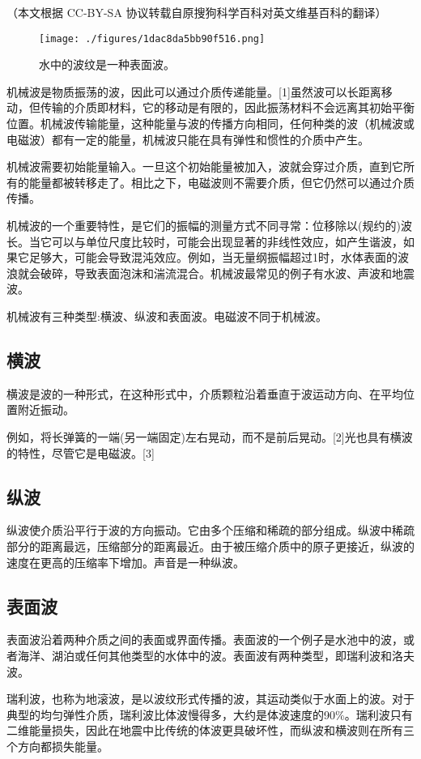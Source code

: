 
（本文根据 CC-BY-SA 协议转载自原搜狗科学百科对英文维基百科的翻译）

\begin{figure}[ht]
\centering
\texttt{[image: ./figures/1dac8da5bb90f516.png]}
\caption{水中的波纹是一种表面波。} \label{fig_JXB_1}
\end{figure}

机械波是物质振荡的波，因此可以通过介质传递能量。[1]虽然波可以长距离移动，但传输的介质即材料，它的移动是有限的，因此振荡材料不会远离其初始平衡位置。机械波传输能量，这种能量与波的传播方向相同，任何种类的波（机械波或电磁波）都有一定的能量，机械波只能在具有弹性和惯性的介质中产生。

机械波需要初始能量输入。一旦这个初始能量被加入，波就会穿过介质，直到它所有的能量都被转移走了。相比之下，电磁波则不需要介质，但它仍然可以通过介质传播。

机械波的一个重要特性，是它们的振幅的测量方式不同寻常：位移除以(规约的)波长。当它可以与单位尺度比较时，可能会出现显著的非线性效应，如产生谐波，如果它足够大，可能会导致混沌效应。例如，当无量纲振幅超过1时，水体表面的波浪就会破碎，导致表面泡沫和湍流混合。机械波最常见的例子有水波、声波和地震波。

机械波有三种类型:横波、纵波和表面波。电磁波不同于机械波。
\subsection{横波}
横波是波的一种形式，在这种形式中，介质颗粒沿着垂直于波运动方向、在平均位置附近振动。

例如，将长弹簧的一端(另一端固定)左右晃动，而不是前后晃动。[2]光也具有横波的特性，尽管它是电磁波。[3]
\subsection{纵波}
纵波使介质沿平行于波的方向振动。它由多个压缩和稀疏的部分组成。纵波中稀疏部分的距离最远，压缩部分的距离最近。由于被压缩介质中的原子更接近，纵波的速度在更高的压缩率下增加。声音是一种纵波。
\subsection{表面波}
表面波沿着两种介质之间的表面或界面传播。表面波的一个例子是水池中的波，或者海洋、湖泊或任何其他类型的水体中的波。表面波有两种类型，即瑞利波和洛夫波。

瑞利波，也称为地滚波，是以波纹形式传播的波，其运动类似于水面上的波。对于典型的均匀弹性介质，瑞利波比体波慢得多，大约是体波速度的90\%。瑞利波只有二维能量损失，因此在地震中比传统的体波更具破坏性，而纵波和横波则在所有三个方向都损失能量。

